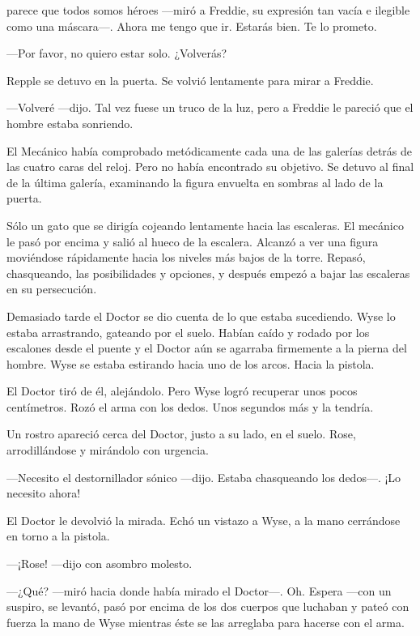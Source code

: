 {parece que todos somos héroes ---miró a Freddie, su expresión tan vacía
	e ilegible como una máscara---. Ahora me tengo que ir. Estarás bien. Te
lo prometo.}

{---Por favor, no quiero estar solo. ¿Volverás?}

{Repple se detuvo en la puerta. Se volvió lentamente para mirar a
Freddie.}

{---Volveré ---dijo. Tal vez fuese un truco de la luz, pero a Freddie le
pareció que el hombre estaba sonriendo.}

\mbox{}

{El Mecánico había comprobado metódicamente cada una de las galerías
	detrás de las cuatro caras del reloj. Pero no había encontrado su
	objetivo. Se detuvo al final de la última galería, examinando la figura
envuelta en sombras al lado de la puerta.}

{Sólo un gato que se dirigía cojeando lentamente hacia las escaleras. El
	mecánico le pasó por encima y salió al hueco de la escalera. Alcanzó a
	ver una figura moviéndose rápidamente hacia los niveles más bajos de la
	torre. Repasó, chasqueando, las posibilidades y opciones, y después
empezó a bajar las escaleras en su persecución.}

{Demasiado tarde el Doctor se dio cuenta de lo que estaba sucediendo.
	Wyse lo estaba arrastrando, gateando por el suelo. Habían caído y rodado
	por los escalones desde el puente y el Doctor aún se agarraba firmemente
	a la pierna del hombre. Wyse se estaba estirando hacia uno de los arcos.
Hacia la pistola.}

{El Doctor tiró de él, alejándolo. Pero Wyse logró recuperar unos pocos
	centímetros. Rozó el arma con los dedos. Unos segundos más y la
tendría.}

{Un rostro apareció cerca del Doctor, justo a su lado, en el suelo.
Rose, arrodillándose y mirándolo con urgencia.}

{---Necesito el destornillador sónico ---dijo. Estaba chasqueando los
dedos---. ¡Lo necesito ahora!}

{El Doctor le devolvió la mirada. Echó un vistazo a Wyse, a la mano
cerrándose en torno a la pistola.}

{---¡Rose! ---dijo con asombro molesto.}

{---¿Qué? ---miró hacia donde había mirado el Doctor---. Oh. Espera
	---con un suspiro, se levantó, pasó por encima de los dos cuerpos que
	luchaban y pateó con fuerza la mano de Wyse mientras éste se las
arreglaba para hacerse con el arma.}

